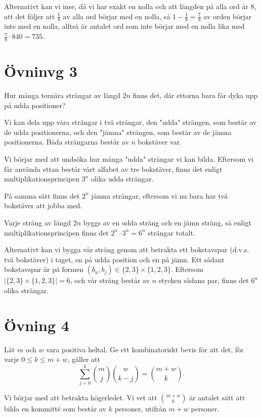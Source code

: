 \documentclass{article}
\begin{document}
Alternativt kan vi inse, då vi har exakt en nolla och att längden på alla ord är $8$, att det följer att $\frac{1}{8}$ av alla ord börjar med en nolla, så $1-\frac{1}{8}=\frac{7}{8}$ av orden börjar inte med en nolla, alltså är antalet ord som inte börjar med en nolla lika med $\frac{7}{8}\cdot 840=735$.

\section*{Övninvg 3}
\begin{xca}
  Hur många ternära strängar av längd $2n$ finns det, där ettorna bara får dyka upp på udda positioner?
\end{xca}

Vi kan dela upp våra strängar i två strängar, den "udda" strängen, som består av de udda positionerna, och den "jämna" strängen, som består av de jämna positionerna. Båda strängarna består av $n$ bokstäver var. 

Vi börjar med att undsöka hur många "udda" strängar vi kan bilda. Eftersom vi får använda ettan består vårt alfabet av tre bokstäver,  finns det enligt multiplikationsprincipen $3^n$ olika udda strängar. 

På samma sätt finns det $2^n$ jämna strängar, eftersom vi nu bara har två bokstäver att jobba med. 

Varje sträng av längd $2n$ byggs av en udda sträng och en jämn sträng, så enligt multiplikationsprincipen finns det $2^n\cdot 3^n=6^n$ strängar totalt. 


Alternativt kan vi bygga vår sträng genom att betrakta ett bokstavspar (d.v.s. två bokstäver) i taget, en på udda position och en på jämn. Ett sådant bokstavspar är på formen $(b_u, b_j)\in \{2, 3\}\times \{1, 2, 3\}$. Eftersom $|\{2, 3\}\times \{1, 2, 3\}|=6$, och vår sträng består av $n$ stycken sådana par, finns det $6^n$ olika strängar. 

\section*{Övning 4}

\begin{xca}
  Låt $m$ och $w$ vara positiva heltal. Ge ett kombinatoriskt bevis för att det, för varje $0 \leq k \leq m + w$, gäller att
  $$\sum_{j=0}^k \binom{m}{j}\binom{w}{k-j} = \binom{m + w}{k}.$$
\end{xca}

Vi börjar med att betrakta högerledet. Vi vet att $m + w \choose k$ är antalet sätt att bilda en kommitté som består av $k$ personer, utifrån $m + w$ personer. 
\end{document}
